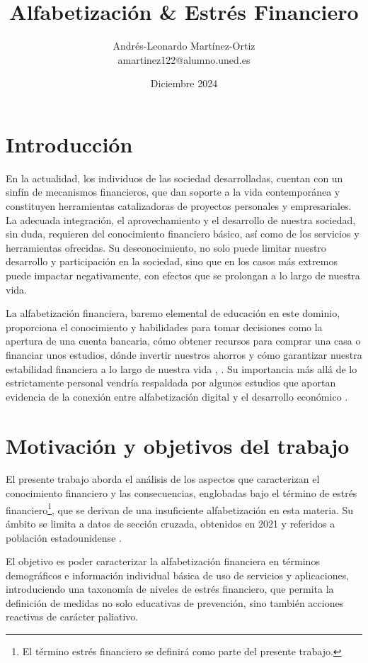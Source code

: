 \documentclass[a4paper, 11pt]{article}
\title{Alfabetización \& Estrés Financiero}
\author{Andrés-Leonardo Martínez-Ortiz \\ amartinez122@alumno.uned.es}
\date{Diciembre 2024}
\begin{document}
\maketitle
\section{Introducción}
En la actualidad, los individuos de las sociedad desarrolladas, cuentan con 
un sinfín de mecanismos financieros, que dan soporte a la vida contemporánea
y constituyen herramientas catalizadoras de proyectos personales y empresariales. 
La adecuada integración, el aprovechamiento y el desarrollo de
nuestra sociedad, sin duda, requieren del conocimiento financiero básico, así como
de los servicios y herramientas ofrecidas. Su desconocimiento, no solo puede limitar
nuestro desarrollo y participación en la sociedad, sino que en los casos más extremos
puede impactar negativamente, con efectos que se prolongan a lo largo de nuestra
vida. 

La alfabetización financiera, baremo elemental de educación en este dominio, 
proporciona el conocimiento y habilidades para tomar decisiones como la 
apertura de una cuenta bancaria, cómo obtener recursos para comprar una
casa o financiar unos estudios, dónde invertir nuestros ahorros y cómo 
garantizar nuestra estabilidad financiera a lo largo de nuestra vida
\cite{EU01}, \cite{OCDE01}. Su importancia más allá de lo estrictamente personal 
vendría respaldada por algunos estudios que aportan evidencia de
la conexión entre alfabetización digital y el desarrollo económico \cite{Lusardi14}. 

\section{Motivación y objetivos del trabajo}
\label{motivacion}
El presente trabajo aborda el análisis de los aspectos que caracterizan el conocimiento 
financiero y las consecuencias, englobadas bajo el término de estrés financiero\footnote{El término
estrés financiero se definirá como parte del presente trabajo.}, que se derivan de una insuficiente
alfabetización en esta materia. Su ámbito se limita a datos de sección cruzada, obtenidos en 2021 y 
referidos a población estadounidense \cite{NFCS01}.

El objetivo es poder caracterizar la alfabetización financiera en términos demográficos e información
individual básica de uso de servicios y aplicaciones, introduciendo una taxonomía de niveles de estrés
financiero, que permita la definición de medidas no solo educativas de prevención, sino también acciones
reactivas de carácter paliativo.
\end{document}
